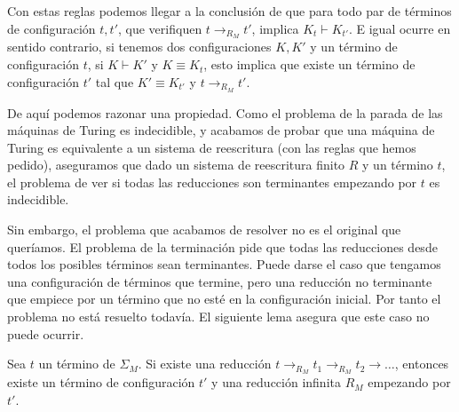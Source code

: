Con estas reglas podemos llegar a la conclusión de que para todo par
de términos de configuración $t, t'$, que verifiquen
$t \rightarrow_{R_M} t'$, implica $K_t \vdash K_{t'}$. E igual ocurre
en sentido contrario, si tenemos dos configuraciones $K, K'$ y un
término de configuración $t$, si $K \vdash K'$ y $K \equiv K_t$, esto
implica que existe un término de configuración $t'$ tal que
$K' \equiv K_{t'}$ y $t \rightarrow_{R_M} t'$. \label{prop:4}

De aquí podemos razonar una propiedad. Como el problema de la parada
de las máquinas de Turing es indecidible, y acabamos de probar que una
máquina de Turing es equivalente a un sistema de reescritura (con las
reglas que hemos pedido), aseguramos que dado un sistema de
reescritura finito $R$ y un término $t$, el problema de ver si todas
las reducciones son terminantes empezando por $t$ es indecidible.

Sin embargo, el problema que acabamos de resolver no es el original
que queríamos. El problema de la terminación pide que todas las
reducciones desde todos los posibles términos sean terminantes. Puede
darse el caso que tengamos una configuración de términos que termine,
pero una reducción no terminante que empiece por un término que no
esté en la configuración inicial. Por tanto el problema no está
resuelto todavía. El siguiente lema asegura que este caso no puede
ocurrir.

\begin{lema} \label{lema:4.1}
  Sea  $t$  un  término  de   $\Sigma_M$.   Si  existe  una  reducción
  $t \rightarrow_{R_M}  t_1 \rightarrow_{R_M} t_2  \rightarrow \dots$,
  entonces existe  un término  de configuración  $t'$ y  una reducción
  infinita $R_M$ empezando por $t'$.
\end{lema}

